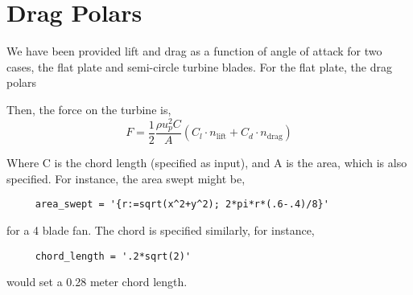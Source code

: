 \documentclass{article}
\begin{document}
\newpage
\section{Drag Polars}

We have been provided lift and drag as a function of angle of attack for
two cases, the flat plate and semi-circle turbine blades. 
For the flat plate, the drag polars 


Then, the force on the turbine is, 
\begin{equation}
 \boxed{F = \frac{1}{2}\frac{\rho u_p^2 C}{A}\left(C_l \cdot
					      n_\text{lift} + C_d \cdot n_\text{drag}  \right)}
\end{equation}

Where C is the chord length (specified as input), and A is the area,
which is also specified. For instance, the area swept might be, 
\begin{lstlisting}
     area_swept = '{r:=sqrt(x^2+y^2); 2*pi*r*(.6-.4)/8}'
\end{lstlisting}
for a 4 blade fan. The chord is specified similarly, for instance, 
\begin{lstlisting}
     chord_length = '.2*sqrt(2)'
\end{lstlisting}
would set a 0.28 meter chord length. 
%




\end{document}
